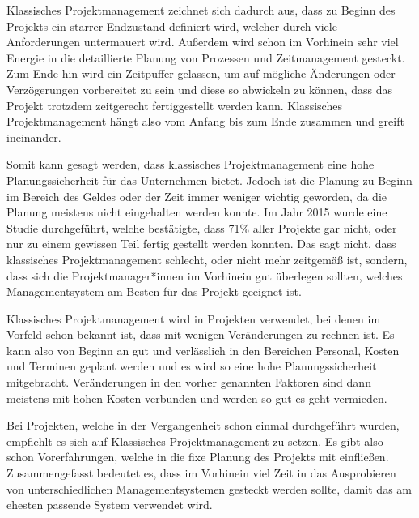 \label{sec:klassisch}


Klassisches Projektmanagement zeichnet sich dadurch aus, dass zu Beginn des Projekts ein starrer Endzustand definiert wird, welcher durch viele Anforderungen untermauert wird. Außerdem wird schon im Vorhinein sehr viel Energie in die detaillierte Planung von Prozessen und Zeitmanagement gesteckt. Zum Ende hin wird ein Zeitpuffer gelassen, um auf mögliche Änderungen oder Verzögerungen vorbereitet zu sein und diese so abwickeln zu können, dass das Projekt trotzdem zeitgerecht fertiggestellt werden kann. Klassisches Projektmanagement hängt also vom Anfang bis zum Ende zusammen und greift ineinander. \cite{Projectman.}

Somit kann gesagt werden, dass klassisches Projektmanagement eine hohe Planungssicherheit für das Unternehmen bietet. Jedoch ist die Planung zu Beginn im Bereich des Geldes oder der Zeit immer weniger wichtig geworden, da die Planung meistens nicht eingehalten werden konnte. Im Jahr 2015 wurde eine Studie durchgeführt, welche bestätigte, dass 71\% aller Projekte gar nicht, oder nur zu einem gewissen Teil fertig gestellt werden konnten. Das sagt nicht, dass klassisches Projektmanagement schlecht, oder nicht mehr zeitgemäß ist, sondern, dass sich die Projektmanager*innen im Vorhinein gut überlegen sollten, welches Managementsystem am Besten für das Projekt geeignet ist.  \cite{Projectman.}


Klassisches Projektmanagement wird in Projekten verwendet, bei denen im Vorfeld schon bekannt ist, dass mit wenigen Veränderungen zu rechnen ist. Es kann also von Beginn an gut und verlässlich in den Bereichen Personal, Kosten und Terminen geplant werden und es wird so eine hohe Planungssicherheit mitgebracht. Veränderungen in den vorher genannten Faktoren sind dann meistens mit hohen Kosten verbunden und werden so gut es geht vermieden. \cite{Projectman.}

Bei Projekten, welche in der Vergangenheit schon einmal durchgeführt wurden, empfiehlt es sich auf Klassisches Projektmanagement zu setzen. Es gibt also schon Vorerfahrungen, welche in die fixe Planung des Projekts mit einfließen. Zusammengefasst bedeutet es, dass im Vorhinein viel Zeit in das Ausprobieren von unterschiedlichen Managementsystemen gesteckt werden sollte, damit das am ehesten passende System verwendet wird. \cite{Projectman.}

